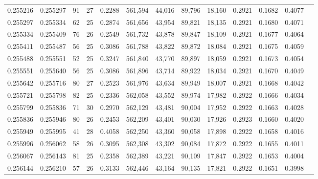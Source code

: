 \begin{tabular}{rrrrrrrrrrrrr}
0.255216 & 0.255297 &  91 &  27 &                                     0.2288 & 561,594 &  44,016 &  89,796 &  18,160 & 0.2921 & 0.1682 & 0.4077 \\
0.255297 & 0.255334 &  62 &  25 &                                     0.2874 & 561,656 &  43,954 &  89,821 &  18,135 & 0.2921 & 0.1680 & 0.4071 \\
0.255334 & 0.255409 &  76 &  26 &                                     0.2549 & 561,732 &  43,878 &  89,847 &  18,109 & 0.2921 & 0.1677 & 0.4064 \\
0.255411 & 0.255487 &  56 &  25 &                                     0.3086 & 561,788 &  43,822 &  89,872 &  18,084 & 0.2921 & 0.1675 & 0.4059 \\
0.255488 & 0.255551 &  52 &  25 &                                     0.3247 & 561,840 &  43,770 &  89,897 &  18,059 & 0.2921 & 0.1673 & 0.4054 \\
0.255551 & 0.255640 &  56 &  25 &                                     0.3086 & 561,896 &  43,714 &  89,922 &  18,034 & 0.2921 & 0.1670 & 0.4049 \\
0.255642 & 0.255716 &  80 &  27 &                                     0.2523 & 561,976 &  43,634 &  89,949 &  18,007 & 0.2921 & 0.1668 & 0.4042 \\
0.255721 & 0.255798 &  82 &  25 &                                     0.2336 & 562,058 &  43,552 &  89,974 &  17,982 & 0.2922 & 0.1666 & 0.4034 \\
0.255799 & 0.255836 &  71 &  30 &                                     0.2970 & 562,129 &  43,481 &  90,004 &  17,952 & 0.2922 & 0.1663 & 0.4028 \\
0.255836 & 0.255946 &  80 &  26 &                                     0.2453 & 562,209 &  43,401 &  90,030 &  17,926 & 0.2923 & 0.1660 & 0.4020 \\
0.255949 & 0.255995 &  41 &  28 &                                     0.4058 & 562,250 &  43,360 &  90,058 &  17,898 & 0.2922 & 0.1658 & 0.4016 \\
0.255996 & 0.256062 &  58 &  26 &                                     0.3095 & 562,308 &  43,302 &  90,084 &  17,872 & 0.2922 & 0.1655 & 0.4011 \\
0.256067 & 0.256143 &  81 &  25 &                                     0.2358 & 562,389 &  43,221 &  90,109 &  17,847 & 0.2922 & 0.1653 & 0.4004 \\
0.256144 & 0.256210 &  57 &  26 &                                     0.3133 & 562,446 &  43,164 &  90,135 &  17,821 & 0.2922 & 0.1651 & 0.3998 \\

\end{tabular}
